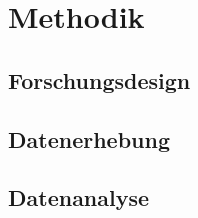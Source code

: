 \chapter{Methodik}

\section{Forschungsdesign}

\lipsum[1]

\section{Datenerhebung}

\lipsum[2]

\section{Datenanalyse}

\lipsum[3]
